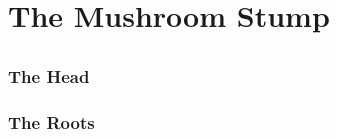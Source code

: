 \chapter{The Mushroom Stump}

\section{}

\begin{multicols}{2}

\noindent

\renewcommand\csComments{
  \callout{0,6}{1,-1}{Slope}{}
  \callout{1,8}{1.5,-5}{}{}
  \callout{1,8}{1.5,-1}{Towers}{2 archers each}
  \callout[8]{3.5,1}{.7,.5}{The Philosopher}{}
  \callout{7.5,0}{0,2.5}{Dining Hall}{}
  \callout{5.5,9}{0,-2}{Stables}{}
  \callout{9,9}{0,-2}{Treasury}{$\dicef{6} + 2$ things}
  \callout[1]{10,4}{0,0}{\outline{F}}{}
  \callout{18,5}{-2,-2}{Passing room}{}
  \callout{16,8}{-2,-2}{End Room}{}
}



\renewcommand\csComments{
  \callout{1,8}{1.5,-1}{Archers}{}
  \callout[9]{0.5,5}{0.5,0}{Supply Room}{}
  \callout{5,0}{.2,.5}{More stairs}{}
  \callout{7.5,0}{0,2.5}{Room}{}
  \callout{9,9}{0,-2}{Boat-Watching Room}{}
  \callout{7,9}{0,-2}{Kitchen}{}
  \callout{18,5}{-2,-2}{Bedroom}{}
  \callout{16,8}{-2,-2}{Passing Place}{}
}


\renewcommand\csComments{
  \callout{1,8}{1.5,-1}{Towers}{}
  \callout[12]{9,9}{.5,-2}{\Gls{keepWarden}}{Bed in corner.  Three alchemical recipe books.  Cooking equipment.  3 Earth \glspl{ingredient}, 2 Fire \glspl{ingredient}, and 2 Water \glspl{ingredient}}
  \callout[5]{16,8}{-2,-2}{3~Archers}{}
}


\subsection{The Head}


\subsection{The Roots}


\end{multicols}
